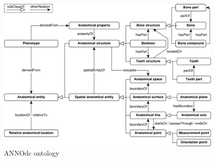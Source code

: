 \documentclass[sw]{iosart2x}
\begin{document}
\begin{figure}[h]
\includegraphics[width=\textwidth]{img/core.pdf}
\caption{ANNOdc ontology}\label{fig:core}
\end{figure}
\end{document}
